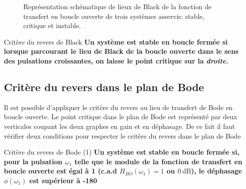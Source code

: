 \begin{figure}[!h]
\begin{center}
\end{center}
\caption{Représentation schématique de lieux de Black de la 
    fonction de transfert en boucle ouverte de trois systèmes 
    asservis: stable, critique et instable.
\label{fig-black_revers}}
\end{figure}

\begin{criteria}{Critère du revers de Black}
\textbf{Un système est stable en boucle fermée si lorsque parcourant 
        le lieu de Black de la boucle ouverte dans le sens des 
        pulsations croissantes, on laisse le point critique sur 
        la \emph{droite}.}
\end{criteria}
\newpage
\subsection{Critère du revers dans le plan de Bode}

Il est possible d'appliquer le critère du revers au lieu de transfert de Bode
en boucle ouverte. Le point critique
dans le plan de Bode est représenté par deux verticales coupant les deux 
graphes en gain et en déphasage. De ce fait il faut vérifier deux conditions 
pour respecter le critère du revers dans le plan de Bode 
\begin{criteria}{Critère du revers de Bode (1)}
\textbf{Un système est stable en boucle fermée si, pour la pulsation 
        $\omega_{1}$ telle que le module de la fonction de transfert en boucle 
        ouverte est égal à 1 (c.a.d $H_{BO}(\omega_{1})=1$ ou $\SI{0}{\dB}$), 
        le déphasage $\phi(\omega_1)$ est supérieur à -180\degree}
\end{criteria}

